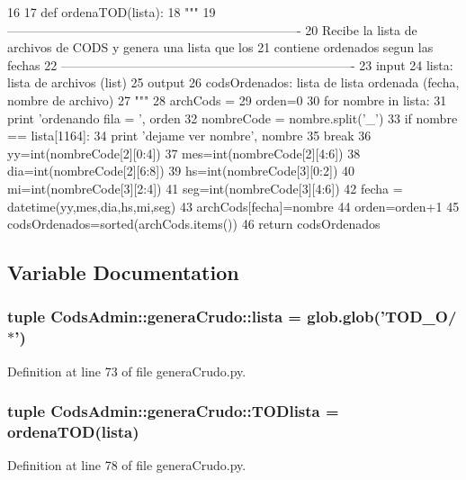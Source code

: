 \begin{DoxyCode}
16 
17 def ordenaTOD(lista):
18     """
19     ----------------------------------------------------------------------
20     Recibe la lista de archivos de CODS y genera una lista que los 
21     contiene ordenados segun las fechas
22     ----------------------------------------------------------------------
23     input
24         lista: lista de archivos (list)
25     output
26         codsOrdenados: lista de lista ordenada (fecha, nombre de archivo)
27     """
28     archCods = {}
29     orden=0
30     for nombre in lista:
31         print 'ordenando fila = ', orden
32         nombreCode = nombre.split('_')
33         if nombre == lista[1164]:
34              print 'dejame ver nombre', nombre
35              break
36         yy=int(nombreCode[2][0:4])
37         mes=int(nombreCode[2][4:6])
38         dia=int(nombreCode[2][6:8])
39         hs=int(nombreCode[3][0:2])
40         mi=int(nombreCode[3][2:4])
41         seg=int(nombreCode[3][4:6])
42         fecha = datetime(yy,mes,dia,hs,mi,seg)
43         archCods[fecha]=nombre
44         orden=orden+1
45     codsOrdenados=sorted(archCods.items())
46     return codsOrdenados

\end{DoxyCode}


\subsection{\-Variable \-Documentation}
\subsubsection[{lista}]{\setlength{\rightskip}{0pt plus 5cm}tuple {\bf \-Cods\-Admin\-::genera\-Crudo\-::lista} = glob.\-glob('\-T\-O\-D\-\_\-\-O/$\ast$')}\label{namespace_cods_admin_1_1genera_crudo_a1b142ddd3b0eb9dfbcc9f8fe60e894c9}


\-Definition at line 73 of file genera\-Crudo.\-py.

\subsubsection[{\-T\-O\-Dlista}]{\setlength{\rightskip}{0pt plus 5cm}tuple {\bf \-Cods\-Admin\-::genera\-Crudo\-::\-T\-O\-Dlista} = {\bf ordena\-T\-O\-D}({\bf lista})}\label{namespace_cods_admin_1_1genera_crudo_aa2885a84c00e50bf5f7bf14d9e50d44c}


\-Definition at line 78 of file genera\-Crudo.\-py.


